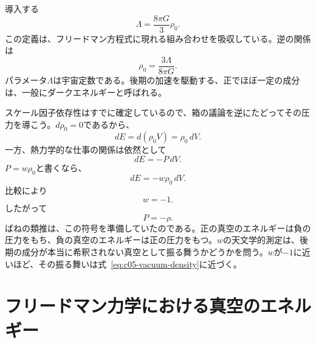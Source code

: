 導入する
\begin{equation}
\Lambda=\frac{8\pi G}{3}\rho_0.
\label{eq:c05-lambda-definition}
\end{equation}
この定義は、フリードマン方程式に現れる組み合わせを吸収している。逆の関係は
\begin{equation}
\rho_0=\frac{3\Lambda}{8\pi G}.
\end{equation}
パラメータ\(\Lambda\)は宇宙定数である。後期の加速を駆動する、正でほぼ一定の成分は、一般にダークエネルギーと呼ばれる。

スケール因子依存性はすでに確定しているので、箱の議論を逆にたどってその圧力を導こう。\(d\rho_0=0\)であるから、
\begin{equation}
dE=d(\rho_0V)=\rho_0\,dV.
\end{equation}
一方、熱力学的な仕事の関係は依然として
\begin{equation}
dE=-P\,dV.
\end{equation}
\(P=w\rho_0\)と書くなら、
\begin{equation}
dE=-w\rho_0\,dV.
\end{equation}
比較により
\begin{equation}
w=-1.
\end{equation}
したがって
\begin{equation}
P=-\rho.
\end{equation}
ばねの類推は、この符号を準備していたのである。正の真空のエネルギーは負の圧力をもち、負の真空のエネルギーは正の圧力をもつ。\(w\)の天文学的測定は、後期の成分が本当に希釈されない真空として振る舞うかどうかを問う。\(w\)が\(-1\)に近いほど、その振る舞いは式~\eqref{eq:c05-vacuum-density}に近づく。

\begin{classroomqa}
\end{classroomqa}

\section{フリードマン力学における真空のエネルギー}

